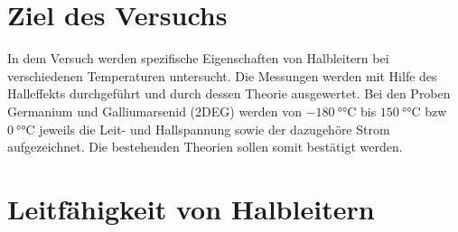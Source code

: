 
\section{Ziel des Versuchs}
In dem Versuch werden spezifische Eigenschaften von Halbleitern bei verschiedenen Temperaturen untersucht. Die Messungen werden mit Hilfe des Halleffekts durchgeführt und durch dessen Theorie ausgewertet. Bei den Proben Germanium und Galliumarsenid (2DEG) werden von $\SI{-180}{\degree\celsius}$ bis $\SI{150}{\degree\celsius}$ bzw $\SI{0}{\degree\celsius}$ jeweils die Leit- und Hallspannung sowie der dazugehöre Strom aufgezeichnet. Die bestehenden Theorien sollen somit bestätigt werden.

\section{Leitfähigkeit von Halbleitern}

